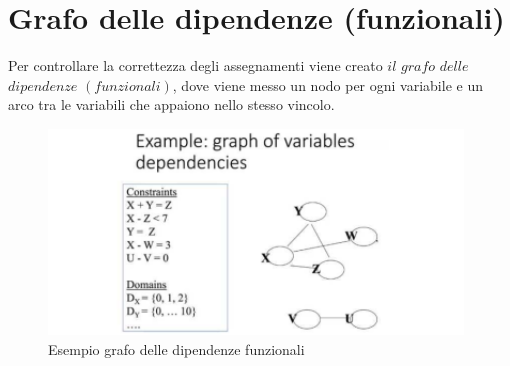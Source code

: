 \section{Grafo delle dipendenze (funzionali)}
Per controllare la correttezza degli assegnamenti viene creato $il$ $grafo$ $delle$ $dipendenze$   $(funzionali)$, dove viene messo un nodo per ogni variabile e un arco tra le variabili che appaiono nello stesso vincolo.
\begin{figure}[htp]
    \centering
    \includegraphics[width=11cm, keepaspectratio]{img/Cap2/grafo-funzionali.png}
    \caption{Esempio grafo delle dipendenze funzionali}
\end{figure}
